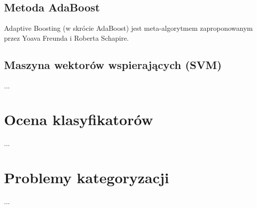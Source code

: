 \subsection{Metoda AdaBoost}
Adaptive Boosting (w skrócie AdaBoost) jest meta-algorytmem zaproponowanym przez Yoava Freunda i Roberta Schapire.

\subsection{Maszyna wektorów wspierających (SVM)}
...
	
\section{Ocena klasyfikatorów}
...

\section{Problemy kategoryzacji}
...